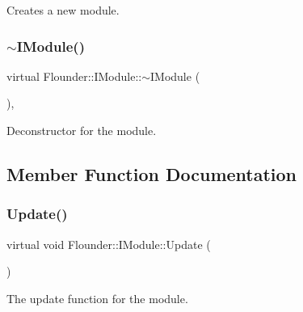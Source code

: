 Creates a new module. 

\mbox{\label{class_flounder_1_1_i_module_a7046424df461dfa1b87d372a5c00f3cd}} 
\subsubsection{\texorpdfstring{$\sim$\+I\+Module()}{~IModule()}}
{\footnotesize\ttfamily virtual Flounder\+::\+I\+Module\+::$\sim$\+I\+Module (\begin{DoxyParamCaption}{ }\end{DoxyParamCaption})\hspace{0.3cm}{\ttfamily [inline]}, {\ttfamily [virtual]}}



Deconstructor for the module. 



\subsection{Member Function Documentation}
\mbox{\label{class_flounder_1_1_i_module_a1812bb03a6990e4698a10c043fa25fde}} 
\subsubsection{\texorpdfstring{Update()}{Update()}}
{\footnotesize\ttfamily virtual void Flounder\+::\+I\+Module\+::\+Update (\begin{DoxyParamCaption}{ }\end{DoxyParamCaption})\hspace{0.3cm}{\ttfamily [pure virtual]}}



The update function for the module. 



